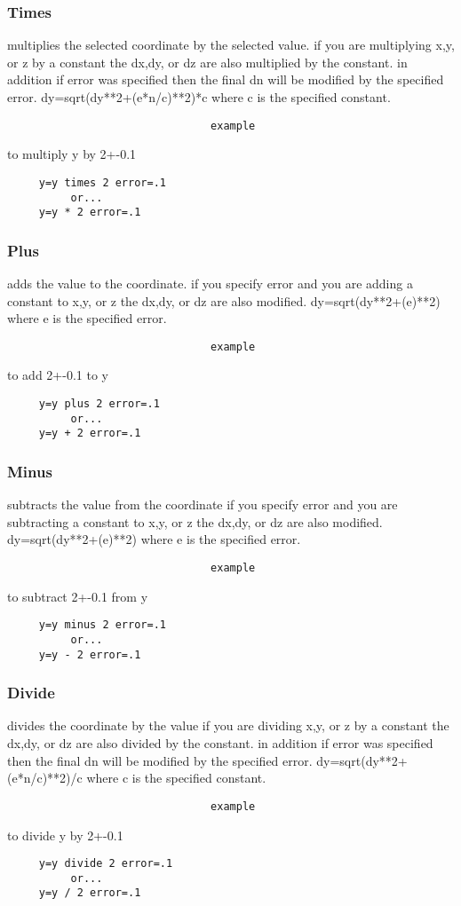 \subsubsection{Times}
multiplies  the  selected coordinate by the selected value.  if you are
multiplying x,y, or  z  by  a  constant  the  dx,dy,  or  dz  are  also
multiplied  by  the  constant.  in addition if error was specified then
the   final   dn   will   be   modified   by   the   specified   error.
dy=sqrt(dy**2+(e*n/c)**2)*c where c is the specified constant.  
\begin{verbatim}
                                example
\end{verbatim}
to multiply y by 2+-0.1 
\begin{verbatim}
     y=y times 2 error=.1 
          or...  
     y=y * 2 error=.1 
\end{verbatim}
\subsubsection{Plus}
adds  the  value  to  the coordinate.  if you specify error and you are
adding a constant to x,y, or z the dx,dy,  or  dz  are  also  modified.
dy=sqrt(dy**2+(e)**2) where e is the specified error.  
\begin{verbatim}
                                example
\end{verbatim}
to add 2+-0.1 to y 
\begin{verbatim}
     y=y plus 2 error=.1 
          or...  
     y=y + 2 error=.1 
\end{verbatim}
\subsubsection{Minus}
subtracts  the  value  from the coordinate if you specify error and you
are subtracting a constant to x,y, or z  the  dx,dy,  or  dz  are  also
modified.  dy=sqrt(dy**2+(e)**2) where e is the specified error.  
\begin{verbatim}
                                example
\end{verbatim}
to subtract 2+-0.1 from y 
\begin{verbatim}
     y=y minus 2 error=.1 
          or...  
     y=y - 2 error=.1 
\end{verbatim}
\subsubsection{Divide}
divides  the coordinate by the value if you are dividing x,y, or z by a
constant the dx,dy, or  dz  are  also  divided  by  the  constant.   in
addition  if  error was specified then the final dn will be modified by
the  specified  error.   dy=sqrt(dy**2+(e*n/c)**2)/c  where  c  is  the
specified constant.  
\begin{verbatim}
                                example
\end{verbatim}
to divide y by 2+-0.1 
\begin{verbatim}
     y=y divide 2 error=.1 
          or...  
     y=y / 2 error=.1 
\end{verbatim}
